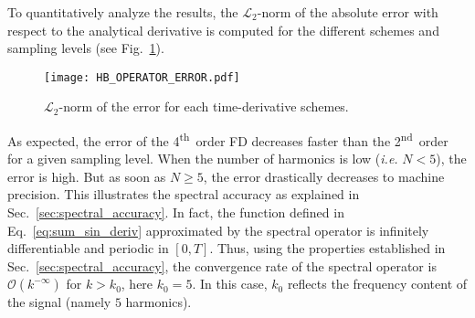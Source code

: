 To quantitatively analyze the results, the 
$\mathcal{L}_2$-norm of the absolute error with respect to the analytical
derivative is computed for the different schemes and 
sampling levels (see Fig.~\ref{fig:hb_operator_error}).
\begin{figure}[htp]
  \centering
   \texttt{[image: HB\_OPERATOR\_ERROR.pdf]}
   \caption{$\mathcal{L}_2$-norm of the error for each time-derivative
   schemes.}
  \label{fig:hb_operator_error}
\end{figure}
As expected, the error of the 4\textsuperscript{th}~order FD
decreases faster  than the 2\textsuperscript{nd}~order for a given sampling level.
When the number of harmonics is low 
(\emph{i.e.} $N < 5$), the error is high. But as soon as $N \geq 5$, the error
drastically decreases to machine precision.
This illustrates the spectral accuracy as explained in 
Sec.~\ref{sec:spectral_accuracy}. In fact, the function defined
in Eq.~\eqref{eq:sum_sin_deriv} approximated by the spectral operator
is infinitely differentiable and periodic in $[0, T]$.
Thus, using the properties established in Sec.~\ref{sec:spectral_accuracy},
the convergence rate of the spectral operator is $\mathcal{O} (k^{-\infty})$
for $k > k_0$, here $k_0=5$. In this case, $k_0$
reflects the frequency content of the signal (namely $5$ harmonics).
